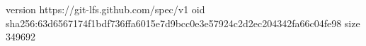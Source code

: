 version https://git-lfs.github.com/spec/v1
oid sha256:63d6567174f1bdf736ffa6015e7d9bcc0e3e57924c2d2ec204342fa66c04fe98
size 349692
